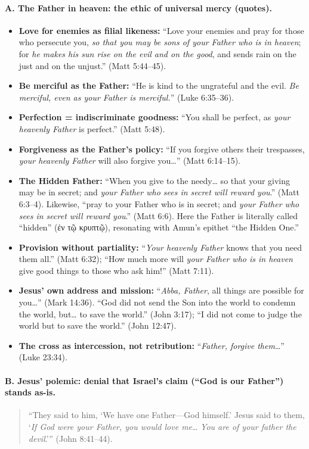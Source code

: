 \paragraph{A. The Father in heaven: the ethic of universal mercy (quotes).}
\begin{itemize}
  \item \textbf{Love for enemies as filial likeness:} “Love your enemies and pray for those who persecute you, \emph{so that you may be sons of your Father who is in heaven}; for \emph{he makes his sun rise on the evil and on the good}, and sends rain on the just and on the unjust.” (Matt 5:44–45).
  \item \textbf{Be merciful as the Father:} “He is kind to the ungrateful and the evil. \emph{Be merciful, even as your Father is merciful.}” (Luke 6:35–36).
  \item \textbf{Perfection = indiscriminate goodness:} “You shall be perfect, as \emph{your heavenly Father} is perfect.” (Matt 5:48).
  \item \textbf{Forgiveness as the Father’s policy:} “If you forgive others their trespasses, \emph{your heavenly Father} will also forgive you…” (Matt 6:14–15).
  \item \textbf{The Hidden Father:} “When you give to the needy… so that your giving may be in secret; and \emph{your Father who sees in secret will reward you}.” (Matt 6:3–4). Likewise, “pray to your Father who is in secret; and \emph{your Father who sees in secret will reward you}.” (Matt 6:6). Here the Father is literally called “hidden” (ἐν τῷ κρυπτῷ), resonating with Amun’s epithet “the Hidden One.”
  \item \textbf{Provision without partiality:} “\emph{Your heavenly Father} knows that you need them all.” (Matt 6:32); “How much more will \emph{your Father who is in heaven} give good things to those who ask him!” (Matt 7:11).
  \item \textbf{Jesus’ own address and mission:} “\emph{Abba, Father}, all things are possible for you…” (Mark 14:36). “God did not send the Son into the world to condemn the world, but… to save the world.” (John 3:17); “I did not come to judge the world but to save the world.” (John 12:47).
  \item \textbf{The cross as intercession, not retribution:} “\emph{Father, forgive them}…” (Luke 23:34).
\end{itemize}

\paragraph{B. Jesus’ polemic: denial that Israel’s claim (“God is our Father”) stands as-is.}
\begin{quote}
“They said to him, ‘We have one Father—God himself.’ Jesus said to them, ‘\emph{If God were your Father, you would love me}… \emph{You are of your father the devil}.’” (John 8:41–44).
\end{quote}

